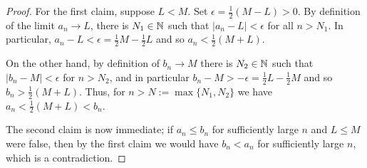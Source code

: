 \documentclass[../main.tex]{subfiles}
\begin{document}
\begin{proof}

For the first claim, suppose $L < M$. Set $\epsilon = \frac{1}{2}(M - L) > 0$.
By definition of the limit $a_n \rightarrow L$, there is $N_1 \in \mathbb{N}$ such
that $|a_n - L| < \epsilon$ for all $n > N_1$. In particular, $a_n - L <
\epsilon = \frac{1}{2}M - \frac{1}{2}L$ and so $a_n < \frac{1}{2}(M + L)$.

On the other hand, by definition of $b_n \rightarrow M$ there is $N_2 \in \mathbb{N}$
such that $|b_n - M| < \epsilon$ for $n > N_2$, and in particular $b_n - M >
-\epsilon = \frac{1}{2}L - \frac{1}{2}M$ and so $b_n > \frac{1}{2}(M + L)$.
Thus, for $n > N:=\max\{N_1, N_2\}$ we have $a_n < \frac{1}{2}(M + L) < b_n$.

The second claim is now immediate; if $a_n \le b_n$ for sufficiently large $n$
and $L \le M$ were false, then by the first claim we would have $b_n < a_n$ for
sufficiently large $n$, which is a contradiction.

\end{proof}
\end{document}
